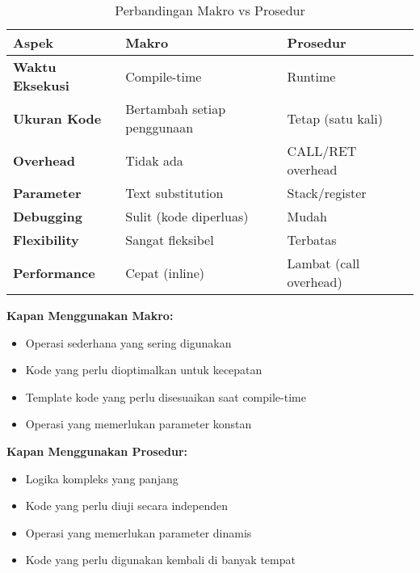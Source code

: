 \documentclass[../main.tex]{subfiles}
\begin{document}
                \begin{table}[H]
                    \centering
                    \caption{Perbandingan Makro vs Prosedur}
                    \begin{tabular}{|p{2.5cm}|p{4.5cm}|p{4.5cm}|}
                        \hline
                        \textbf{Aspek} & \textbf{Makro} & \textbf{Prosedur} \\
                        \hline
                        \textbf{Waktu Eksekusi} & Compile-time & Runtime \\
                        \hline
                        \textbf{Ukuran Kode} & Bertambah setiap penggunaan & Tetap (satu kali) \\
                        \hline
                        \textbf{Overhead} & Tidak ada & CALL/RET overhead \\
                        \hline
                        \textbf{Parameter} & Text substitution & Stack/register \\
                        \hline
                        \textbf{Debugging} & Sulit (kode diperluas) & Mudah \\
                        \hline
                        \textbf{Flexibility} & Sangat fleksibel & Terbatas \\
                        \hline
                        \textbf{Performance} & Cepat (inline) & Lambat (call overhead) \\
                        \hline
                    \end{tabular}
                    \label{tab:macro-vs-procedure}
                \end{table}

                \textbf{Kapan Menggunakan Makro:}
                \begin{itemize}
                    \item Operasi sederhana yang sering digunakan
                    \item Kode yang perlu dioptimalkan untuk kecepatan
                    \item Template kode yang perlu disesuaikan saat compile-time
                    \item Operasi yang memerlukan parameter konstan
                \end{itemize}

                \textbf{Kapan Menggunakan Prosedur:}
                \begin{itemize}
                    \item Logika kompleks yang panjang
                    \item Kode yang perlu diuji secara independen
                    \item Operasi yang memerlukan parameter dinamis
                    \item Kode yang perlu digunakan kembali di banyak tempat
                \end{itemize}
\end{document}
